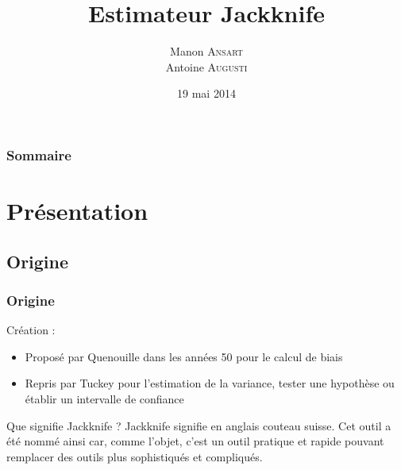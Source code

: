 \documentclass[handout]{beamer}
\title{
	Estimateur Jackknife
}
\author{
	Manon \textsc{Ansart} \\
	\vspace{10px}
	Antoine \textsc{Augusti}
}
\date{19 mai 2014}
\begin{document}
	\begin{frame}[plain]
		\titlepage
	\end{frame}

	\begin{frame}[plain]
		\frametitle{Sommaire}
		\tableofcontents
	\end{frame}


	\section{Présentation}

		\subsection{Origine}
		\begin{frame}
			\frametitle{Origine}
			
			Création :
			\begin{itemize}
				\item Proposé par Quenouille dans les années 50 pour le calcul de biais
				\item Repris par Tuckey pour l'estimation de la variance, tester une hypothèse ou établir un intervalle de confiance
			\end{itemize}


			\vspace{20px}

			\begin{exampleblock}{Que signifie Jackknife ?}
				Jackknife signifie en anglais couteau suisse. Cet outil a été nommé ainsi car, comme l'objet, c'est un outil pratique et rapide pouvant remplacer des outils plus sophistiqués et compliqués.
			\end{exampleblock}
		\end{frame}
		
	
\end{document}
